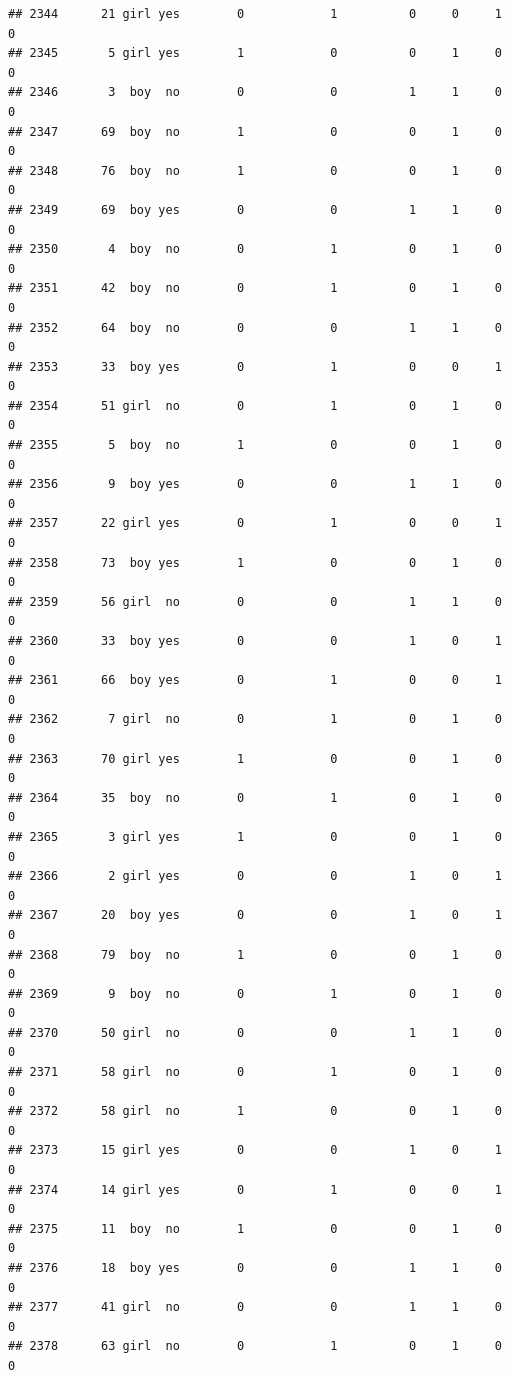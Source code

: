 \documentclass[man]{apa6}
\begin{document}
\begin{verbatim}
## 2344      21 girl yes        0            1          0     0     1     0
## 2345       5 girl yes        1            0          0     1     0     0
## 2346       3  boy  no        0            0          1     1     0     0
## 2347      69  boy  no        1            0          0     1     0     0
## 2348      76  boy  no        1            0          0     1     0     0
## 2349      69  boy yes        0            0          1     1     0     0
## 2350       4  boy  no        0            1          0     1     0     0
## 2351      42  boy  no        0            1          0     1     0     0
## 2352      64  boy  no        0            0          1     1     0     0
## 2353      33  boy yes        0            1          0     0     1     0
## 2354      51 girl  no        0            1          0     1     0     0
## 2355       5  boy  no        1            0          0     1     0     0
## 2356       9  boy yes        0            0          1     1     0     0
## 2357      22 girl yes        0            1          0     0     1     0
## 2358      73  boy yes        1            0          0     1     0     0
## 2359      56 girl  no        0            0          1     1     0     0
## 2360      33  boy yes        0            0          1     0     1     0
## 2361      66  boy yes        0            1          0     0     1     0
## 2362       7 girl  no        0            1          0     1     0     0
## 2363      70 girl yes        1            0          0     1     0     0
## 2364      35  boy  no        0            1          0     1     0     0
## 2365       3 girl yes        1            0          0     1     0     0
## 2366       2 girl yes        0            0          1     0     1     0
## 2367      20  boy yes        0            0          1     0     1     0
## 2368      79  boy  no        1            0          0     1     0     0
## 2369       9  boy  no        0            1          0     1     0     0
## 2370      50 girl  no        0            0          1     1     0     0
## 2371      58 girl  no        0            1          0     1     0     0
## 2372      58 girl  no        1            0          0     1     0     0
## 2373      15 girl yes        0            0          1     0     1     0
## 2374      14 girl yes        0            1          0     0     1     0
## 2375      11  boy  no        1            0          0     1     0     0
## 2376      18  boy yes        0            0          1     1     0     0
## 2377      41 girl  no        0            0          1     1     0     0
## 2378      63 girl  no        0            1          0     1     0     0

\end{verbatim}
\end{document}
